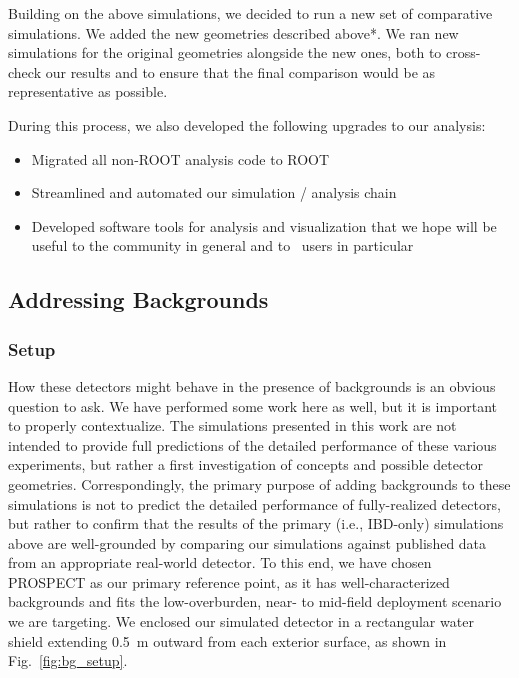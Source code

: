 Building on the above simulations, we decided to run a new set of comparative simulations.
We added the new geometries described above*. %
We ran new simulations for the original geometries alongside the new ones, both to cross-check our results and to ensure that the final comparison would be as representative as possible. %

During this process, we also developed the following upgrades to our analysis:
\begin{itemize}
  \item Migrated all non-ROOT analysis code to ROOT
  \item Streamlined and automated our simulation / analysis chain
  \item Developed software tools for analysis and visualization that we hope will be useful to the community in general and to \rat\ users in particular
\end{itemize}


\subsection{\label{subsec:bgs}Addressing Backgrounds}

\subsubsection{\label{subsubsec:bg_setup}Setup}

How these detectors might behave in the presence of backgrounds is an obvious question to ask.
We have performed some work here as well, but it is important to properly contextualize.
The simulations presented in this work are not intended to provide full predictions of the detailed performance of these various experiments, but rather a first investigation of concepts and possible detector geometries.
Correspondingly, the primary purpose of adding backgrounds to these simulations is not to predict the detailed performance of fully-realized detectors, but rather to confirm that the results of the primary (i.e., IBD-only) simulations above are well-grounded by comparing our simulations against published data from an appropriate real-world detector.
To this end, we have chosen PROSPECT as our primary reference point, as it has well-characterized backgrounds and fits the low-overburden, near- to mid-field deployment scenario we are targeting.
We enclosed our simulated detector in a rectangular water shield extending 0.5~m outward from each exterior surface, as shown in Fig.~\ref{fig:bg_setup}. %

